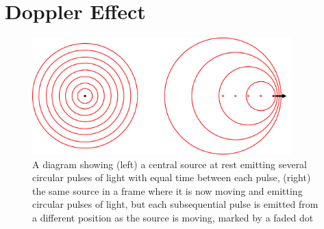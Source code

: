 
\section{Doppler Effect}

\begin{figure}[H]
	\centering
	\includegraphics[width=10cm]{images/pdf/Doppler.pdf}
	\caption{A diagram showing (left) a central source at rest emitting several circular pulses of light with equal time between each pulse, (right) the same source in a frame where it is now moving and emitting circular pulses of light, but each subsequential pulse is emitted from a different position as the source is moving, marked by a faded dot}
	\label{fig: doppler effect intro}
\end{figure}

